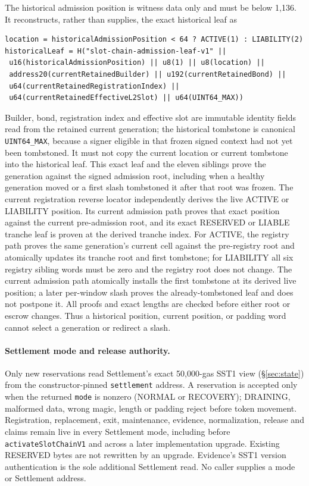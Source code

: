 \documentclass[a4paper,11pt]{article}
\newcommand{\code}[1]{\nolinkurl{#1}}
\begin{document}
The historical admission position is witness data only and must be below
1,136.  It reconstructs, rather than supplies, the exact historical leaf as
\begin{verbatim}
location = historicalAdmissionPosition < 64 ? ACTIVE(1) : LIABILITY(2)
historicalLeaf = H("slot-chain-admission-leaf-v1" ||
 u16(historicalAdmissionPosition) || u8(1) || u8(location) ||
 address20(currentRetainedBuilder) || u192(currentRetainedBond) ||
 u64(currentRetainedRegistrationIndex) ||
 u64(currentRetainedEffectiveL2Slot) || u64(UINT64_MAX))
\end{verbatim}
Builder, bond, registration index and effective slot are immutable identity
fields read from the retained current generation; the historical tombstone is
canonical \code{UINT64_MAX}, because a signer eligible in that frozen signed
context had not yet been tombstoned.  It must not copy the current location or
current tombstone into the historical leaf.  This exact leaf and the eleven
siblings prove the generation against the signed admission root, including
when a healthy generation moved or a first slash tombstoned it after that root
was frozen.  The current registration reverse locator independently derives the live
ACTIVE or LIABILITY position.  Its current admission path proves that exact
position against the current pre-admission root, and its exact RESERVED or
LIABLE tranche leaf is proven at the derived tranche index.  For ACTIVE, the
registry path proves the same generation's current cell against the
pre-registry root and atomically updates its tranche root and first tombstone;
for LIABILITY all six registry sibling words must be zero and the registry root
does not change.  The current admission path atomically installs the first
tombstone at its derived live position; a later per-window slash proves the
already-tombstoned leaf and does not postpone it.  All proofs and exact lengths
are checked before either root or escrow changes.  Thus a historical position,
current position, or padding word cannot select a generation or redirect a
slash.

\paragraph{Settlement mode and release authority.}
Only new reservations read Settlement's exact 50,000-gas SST1 view
(\S\ref{sec:state}) from the constructor-pinned \code{settlement} address.  A
reservation is accepted only when the returned \code{mode} is nonzero (NORMAL
or RECOVERY); DRAINING, malformed data, wrong magic, length or padding reject
before token movement.  Registration, replacement, exit, maintenance,
evidence, normalization, release and claims remain live in every Settlement
mode, including before \code{activateSlotChainV1} and across a later
implementation upgrade.  Existing RESERVED bytes are not rewritten by an
upgrade.  Evidence's SST1 version authentication is the sole additional
Settlement read.  No caller supplies a mode or Settlement address.
\end{document}
